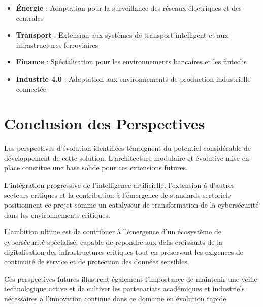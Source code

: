 \begin{itemize}
    \item \textbf{Énergie} : Adaptation pour la surveillance des réseaux électriques et des centrales
    \item \textbf{Transport} : Extension aux systèmes de transport intelligent et aux infrastructures ferroviaires
    \item \textbf{Finance} : Spécialisation pour les environnements bancaires et les fintechs
    \item \textbf{Industrie 4.0} : Adaptation aux environnements de production industrielle connectée
\end{itemize}


\section{Conclusion des Perspectives}

Les perspectives d'évolution identifiées témoignent du potentiel considérable de développement de cette solution. L'architecture modulaire et évolutive mise en place constitue une base solide pour ces extensions futures.

L'intégration progressive de l'intelligence artificielle, l'extension à d'autres secteurs critiques et la contribution à l'émergence de standards sectoriels positionnent ce projet comme un catalyseur de transformation de la cybersécurité dans les environnements critiques.

L'ambition ultime est de contribuer à l'émergence d'un écosystème de cybersécurité spécialisé, capable de répondre aux défis croissants de la digitalisation des infrastructures critiques tout en préservant les exigences de continuité de service et de protection des données sensibles.

Ces perspectives futures illustrent également l'importance de maintenir une veille technologique active et de cultiver les partenariats académiques et industriels nécessaires à l'innovation continue dans ce domaine en évolution rapide.

\newpage
